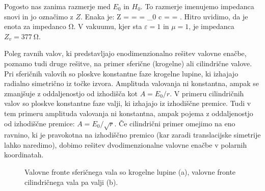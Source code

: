 Pogosto nas zanima razmerje med $E_0$ in $H_0$. To razmerje imenujemo impedanca
snovi in jo označimo z $Z$. Enaka je:
\beq
Z =  =  = \mu \mu_0 c = 
 = .
\label{eq:03_25}
\eeq
Hitro uvidimo, da je enota za impedanco $\si{\ohm}$. V vakuumu, 
kjer sta $\varepsilon = 1$ in $\mu= 1$, je impedanca $Z_v = 377~\si{\ohm}$.

\begin{remark}
Poleg ravnih valov, ki predstavljajo enodimenzionalno rešitev valovne enačbe, poznamo
tudi druge rešitve, na primer sferične (krogelne) ali cilindrične valove. Pri 
sferičnih valovih so ploskve konstantne faze krogelne lupine, ki izhajajo radialno 
simetrično iz točke izvora. Amplituda valovanja ni konstantna, ampak se zmanjšuje z oddaljenostjo 
od izhodišča kot $A = E_0/r$. V primeru cilindričnih valov so ploskve konstantne
faze valji, ki izhajajo iz izhodiščne premice. Tudi v tem primeru amplituda valovanja ni konstantna,
ampak pojema z oddaljenostjo od izhodiščne premice: $A = E_0/\sqrt{r}$.  Če cilindrični 
primer omejimo na eno ravnino, ki je pravokotna na izhodiščno premico (kar zaradi 
translacijske simetrije lahko naredimo), dobimo rešitev dvodimenzionalne valovne enačbe 
v polarnih koordinatah. 
\begin{figure}[ht]
\centering
\def\svgwidth{100truemm} 

\caption{Valovne fronte sferičnega vala so krogelne lupine (a), valovne fronte
cilindričnega vala pa valji (b).}
\label{fig:03_sfericnival}
\end{figure}
\end{remark}

